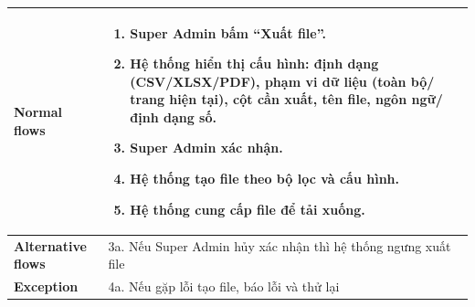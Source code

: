 \begin{enumerate}[label=\textbf{\alph*)}]
\begin{itemize}
\begin{center}
\begin{longtable}{|m{}|m{}|}
          \textbf{Normal flows} &
          \begin{enumerate}[label=\arabic*.]
            \item Super Admin bấm “Xuất file”.
            \item Hệ thống hiển thị cấu hình: định dạng (CSV/XLSX/PDF), phạm vi dữ liệu (toàn bộ/ trang hiện tại), cột cần xuất, tên file, ngôn ngữ/định dạng số.
            \item Super Admin xác nhận.
            \item Hệ thống tạo file theo bộ lọc và cấu hình.
            \item Hệ thống cung cấp file để tải xuống.
          \end{enumerate}\\
          \hline
          \textbf{Alternative flows} &
          3a. Nếu Super Admin hủy xác nhận thì hệ thống ngưng xuất file\\
          \hline
          \textbf{Exception} &
          4a. Nếu gặp lỗi tạo file, báo lỗi và thử lại\\
          \hline
          \end{longtable}
      \end{center}
  \end{itemize}
\end{enumerate}
